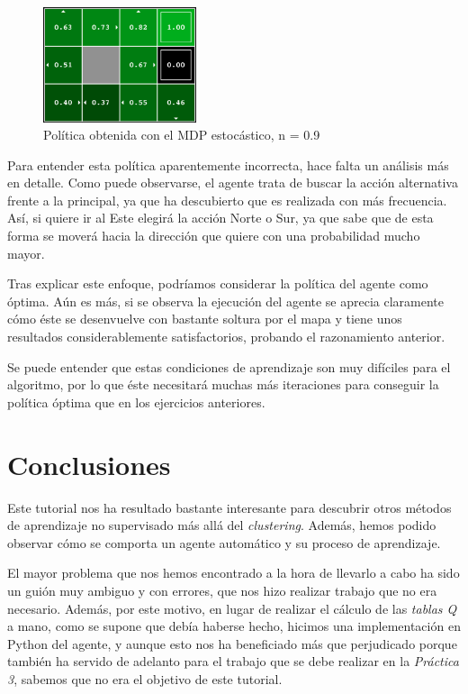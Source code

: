 \documentclass[12pt]{article}
\begin{document}
\begin{figure}[h]
    \centering
    \includegraphics[width=0.4\textwidth]{policy_stochastic09}
    \caption{Política obtenida con el MDP estocástico, n = 0.9}
\end{figure}

Para entender esta política aparentemente incorrecta, hace falta un análisis más en detalle. Como puede observarse, el agente trata de buscar la acción alternativa frente a la principal, ya que ha descubierto que es realizada con más frecuencia. Así, si quiere ir al Este elegirá la acción Norte o Sur, ya que sabe que de esta forma se moverá hacia la dirección que quiere con una probabilidad mucho mayor.

Tras explicar este enfoque, podríamos considerar la política del agente como óptima. Aún es más, si se observa la ejecución del agente se aprecia claramente cómo éste se desenvuelve con bastante soltura por el mapa y tiene unos resultados considerablemente satisfactorios, probando el razonamiento anterior.

Se puede entender que estas condiciones de aprendizaje son muy difíciles para el algoritmo, por lo que éste necesitará muchas más iteraciones para conseguir la política óptima que en los ejercicios anteriores.

\section{Conclusiones}
Este tutorial nos ha resultado bastante interesante para descubrir otros métodos de aprendizaje no supervisado más allá del \textit{clustering}. Además, hemos podido observar cómo se comporta un agente automático y su proceso de aprendizaje.

El mayor problema que nos hemos encontrado a la hora de llevarlo a cabo ha sido un guión muy ambiguo y con errores, que nos hizo realizar trabajo que no era necesario. Además, por este motivo, en lugar de realizar el cálculo de las \textit{tablas Q} a mano, como se supone que debía haberse hecho, hicimos una implementación en Python del agente, y aunque esto nos ha beneficiado más que perjudicado porque también ha servido de adelanto para el trabajo que se debe realizar en la \textit{Práctica 3}, sabemos que no era el objetivo de este tutorial.
\end{document}
